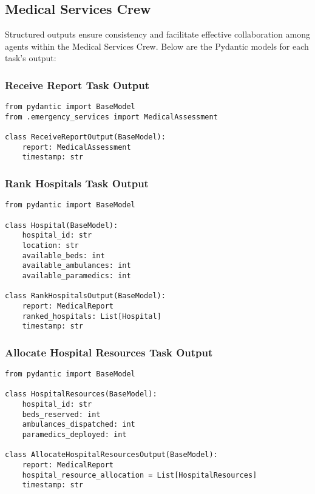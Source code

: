 \subsection{Medical Services Crew}

Structured outputs ensure consistency and facilitate effective collaboration among agents within the Medical Services Crew. Below are the Pydantic models for each task's output:

\subsubsection{Receive Report Task Output}
\begin{lstlisting}[caption={Pydantic model for Receive Report Task Output}]
from pydantic import BaseModel
from .emergency_services import MedicalAssessment

class ReceiveReportOutput(BaseModel):
    report: MedicalAssessment
    timestamp: str
\end{lstlisting}

\subsubsection{Rank Hospitals Task Output}
\begin{lstlisting}[caption={Pydantic model for Rank Hospitals Task Output}]
from pydantic import BaseModel

class Hospital(BaseModel):
    hospital_id: str
    location: str
    available_beds: int
    available_ambulances: int
    available_paramedics: int

class RankHospitalsOutput(BaseModel):
    report: MedicalReport
    ranked_hospitals: List[Hospital]
    timestamp: str
\end{lstlisting}

\subsubsection{Allocate Hospital Resources Task Output}
\begin{lstlisting}[caption={Pydantic model for Allocate Hospital Resources Task Output}]
from pydantic import BaseModel

class HospitalResources(BaseModel):
    hospital_id: str
    beds_reserved: int
    ambulances_dispatched: int
    paramedics_deployed: int

class AllocateHospitalResourcesOutput(BaseModel):
    report: MedicalReport
    hospital_resource_allocation = List[HospitalResources]
    timestamp: str
\end{lstlisting}

